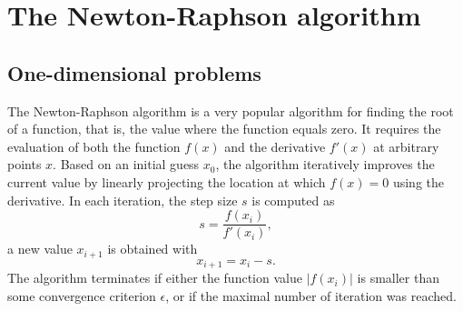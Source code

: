 \documentclass[a4paper,11pt]{article}
\begin{document}
\section{The Newton-Raphson algorithm}
\subsection{One-dimensional problems}
The Newton-Raphson algorithm is a very popular algorithm for finding the root of a function, that is, the value where the function equals zero. It requires the evaluation of both the function $f(x)$ and the derivative $f'(x)$ at arbitrary points $x$. Based on an initial guess $x_0$, the algorithm iteratively improves the current value by linearly projecting the location at which $f(x) = 0$ using the derivative. In each iteration, the step size $s$ is computed as
\begin{equation*}
 s = \frac{f(x_i)}{f'(x_i)},
\end{equation*}
a new value $x_{i+1}$ is obtained with
\begin{equation*}
 x_{i+1} = x_i - s.
\end{equation*}
The algorithm terminates if either the function value $|f(x_i)|$ is smaller than some convergence criterion $\epsilon$, or if the maximal number of iteration was reached.
\end{document}
